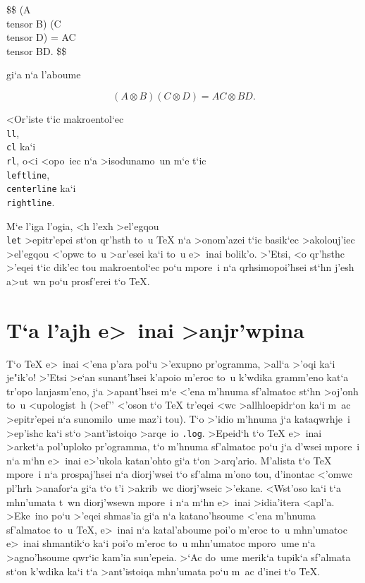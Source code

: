\let\tensor=\otimes
\beginuser
\$\$ (A \\tensor B) (C \\tensor D) = AC \\tensor BD. \$\$
\enduser

\noindent gi`a n`a l'aboume

$$ (A \tensor B) (C \tensor D) = AC \tensor BD. $$

\exercise <Or'iste t`ic makroentol`ec {\tt \\ll}, {\tt \\cl} ka`i {\tt
\\rl}, o<i <opo~iec n`a >isodunamo~un m`e t`ic {\tt \\leftline}, {\tt
\\centerline} ka`i {\tt \\rightline}.

M`e l'iga l'ogia, <h l'exh >el'egqou {\tt \\let} >epitr'epei st`on
qr'hsth to~u {\rm \TeX} n`a >onom'azei t`ic basik`ec >akolouj'iec
>el'egqou <'opwc to~u >ar'esei ka`i to~u e>~inai bolik'o.  >'Etsi, <o
qr'hsthc >'eqei t`ic dik'ec tou makroentol`ec po`u mpore~i n`a
qrhsimopoi'hsei st`hn j'esh a>ut~wn po`u prosf'erei t`o {\rm \TeX}.  


\section{T`a l'ajh e>~inai >anjr'wpina}

T`o {\rm \TeX} e>~inai <'ena p'ara pol`u >'exupno pr'ogramma, >all`a
>'oqi ka`i je"ik'o!  >'Etsi >e`an sunant'hsei k'apoio
m'eroc to~u k'wdika gramm'eno kat`a tr'opo lanjasm'eno, j`a >apant'hsei
m`e <'ena {\tengs m'hnuma sf'al\-matoc} st`hn >oj'onh to~u <upologist~h
(>ef'' <'oson t`o {\rm \TeX} tr'eqei <wc >allhloepidr`on ka`i m~ac
>epitr'epei n`a sunomilo~ume maz'i tou). T`o >'idio m'hnuma j`a
kataqwrhje~i >ep'ishc ka`i st`o >ant'istoiqo >arqe~io {\tt .log}. 
>Epeid`h t`o {\rm \TeX} e>~inai >arket`a pol'uploko pr'ogramma, t`o
m'hnuma sf'almatoc po`u j`a d'wsei mpore~i n`a m`hn e>~inai e>'ukola
katan'ohto gi`a t`on >arq'ario.  M'alista t`o {\rm \TeX} mpore~i n`a
prospaj'hsei n`a diorj'wsei t`o sf'alma m'ono tou, d'inontac <'omwc
pl'hrh >anafor`a gi`a t`o t'i >akrib~wc diorj'wseic >'ekane.  <Wst'oso
ka`i t`a mhn'umata t~wn diorj'wsewn mpore~i n`a m`hn e>~i\-nai >idia'itera
<apl'a. >Eke~ino po`u >'eqei shmas'ia gi`a n`a katano'hsoume <'ena
m'hnuma sf'almatoc to~u {\rm\TeX}, e>~inai n`a katal'aboume poi'o
m'eroc to~u mhn'umatoc e>~inai shmantik`o ka`i poi'o m'eroc to~u
mhn'umatoc mporo~ume n`a >agno'hsoume qwr`ic kam'ia sun'epeia.  >`Ac
do~ume merik`a tupik`a sf'al\-ma\-ta st`on k'wdika ka`i t`a >ant'istoiqa
mhn'umata po`u m~ac d'inei t`o {\rm\TeX}.

